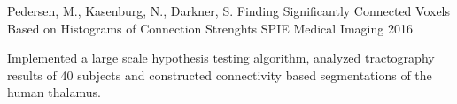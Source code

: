 

\begin{cventries}

  \cventry
    {Pedersen, M., Kasenburg, N., Darkner, S.} %
    {Finding Significantly Connected Voxels Based on Histograms of Connection Strenghts} %
    {SPIE Medical Imaging} %
    {2016} %
    {
      \begin{cvitems} %
        \item {Implemented a large scale hypothesis testing algorithm, analyzed tractography results of 40 subjects and constructed connectivity based segmentations of the human thalamus.}
      \end{cvitems}
    }

\end{cventries}
